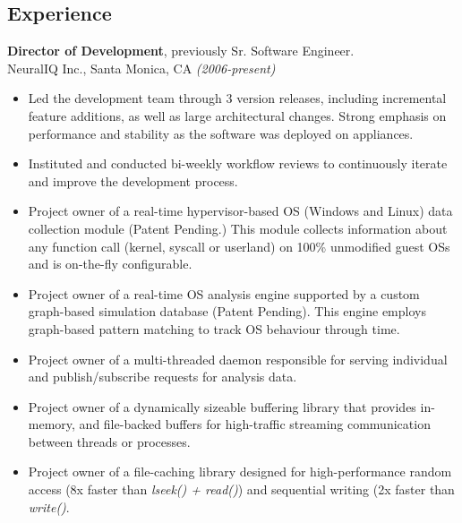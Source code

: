 \documentclass[margin]{res}
\begin{document}
\begin{resume}
\section{Experience}
\noindent
{\bf Director of Development}, previously Sr. Software Engineer. \\
NeuralIQ Inc., Santa Monica, CA {\em (2006-present)} \\
\begin{itemize}
  \item Led the development team through 3 version releases, including
    incremental feature additions, as well as large architectural
    changes.  Strong emphasis on performance and stability as the
    software was deployed on appliances.
  \item Instituted and conducted bi-weekly workflow reviews to
    continuously iterate and improve the development process.
  \item Project owner of a real-time hypervisor-based OS (Windows and
    Linux) data collection module (Patent Pending.)  This module
    collects information about any function call (kernel, syscall or
    userland) on 100\% unmodified guest OSs and is on-the-fly
    configurable.
  \item Project owner of a real-time OS analysis engine supported by a
    custom graph-based simulation database (Patent Pending).  This
    engine employs graph-based pattern matching to track OS behaviour
    through time.
  \item Project owner of a multi-threaded daemon responsible for
    serving individual and publish/subscribe requests for analysis
    data.
  \item Project owner of a dynamically sizeable buffering library that
    provides in-memory, and file-backed buffers for high-traffic
    streaming communication between threads or processes.
  \item Project owner of a file-caching library designed for
    high-performance random access (8x faster than {\em lseek() +
      read()}) and sequential writing (2x faster than {\em
      write()}.
\end{itemize}


\end{resume}
\end{document}

